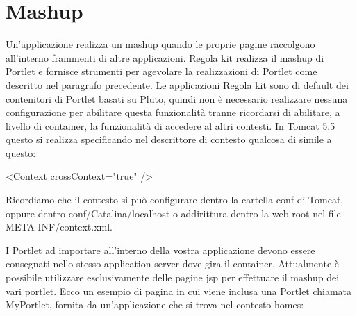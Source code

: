 \section{Mashup}
Un'applicazione realizza un mashup quando le proprie pagine raccolgono all'interno frammenti di altre applicazioni. Regola kit realizza il mashup di Portlet e fornisce strumenti per agevolare la realizzazioni di Portlet come descritto nel paragrafo precedente. Le applicazioni Regola kit sono di default dei contenitori di Portlet basati su Pluto, quindi non è necessario realizzare nessuna configurazione per abilitare questa funzionalità tranne ricordarsi di abilitare, a livello di container, la funzionalità di accedere al altri contesti. In Tomcat 5.5 questo si realizza specificando nel descrittore di contesto qualcosa di simile a questo:

\begin{xml}
<Context crossContext="true" />
\end{xml}

Ricordiamo che il contesto si può configurare dentro la cartella conf di Tomcat, oppure dentro conf/Catalina/localhost o addirittura dentro la web root nel file META-INF/context.xml. 

I Portlet ad importare all'interno della vostra applicazione devono essere consegnati nello stesso application server dove gira il container. Attualmente è possibile utilizzare esclusivamente delle pagine jsp per effettuare il mashup dei vari portlet. Ecco un esempio di pagina in cui viene inclusa una Portlet chiamata MyPortlet, fornita da un'applicazione che si trova nel  contesto homes:




